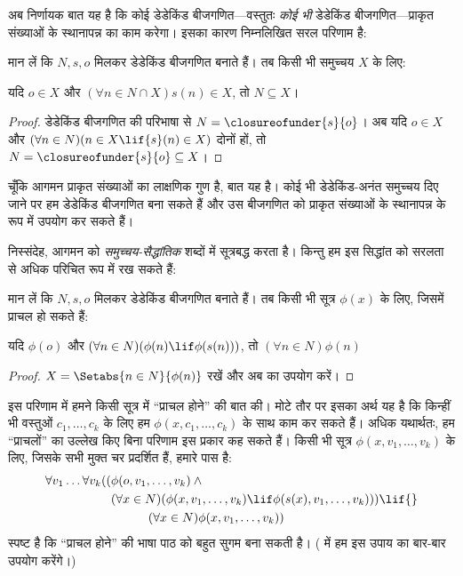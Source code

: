 \documentclass[../../../include/open-logic-section]{subfiles}
\begin{document}

अब निर्णायक बात यह है कि कोई डेडेकिंड बीजगणित---वस्तुतः \emph{कोई भी}
डेडेकिंड बीजगणित---प्राकृत संख्याओं के स्थानापन्न का काम करेगा। इसका कारण
निम्नलिखित सरल परिणाम है:

\begin{thm}
मान लें कि $N, s, o$ मिलकर डेडेकिंड बीजगणित बनाते हैं। तब किसी भी समुच्चय $X$ के लिए:
	\begin{center}
		यदि $o \in X$ और $(\forall {n} \in N \cap X){s}({n}) \in X$, तो $N \subseteq X$।
	\end{center}
\end{thm}

\begin{proof}
डेडेकिंड बीजगणित की परिभाषा से $N = \closureofunder{s}{o}$। अब यदि ${o} \in X$
और $(\forall {n} \in N)(n \in X \lif
{s}({n}) \in X)$ दोनों हों, तो $N = \closureofunder{s}{o} \subseteq X$।
\end{proof}

चूँकि आगमन प्राकृत संख्याओं का लाक्षणिक गुण है, बात यह है। कोई भी
डेडेकिंड-अनंत समुच्चय दिए जाने पर हम डेडेकिंड बीजगणित बना सकते हैं और उस
बीजगणित को प्राकृत संख्याओं के स्थानापन्न के रूप में उपयोग कर सकते हैं।

निस्संदेह,  आगमन को \emph{समुच्चय-सैद्धांतिक}
शब्दों में सूत्रबद्ध करता है। किन्तु हम इस सिद्धांत को सरलता से अधिक परिचित
रूप में रख सकते हैं:

\begin{cor}
मान लें कि $N, s, o$ मिलकर डेडेकिंड बीजगणित बनाते हैं। तब किसी भी सूत्र
$\phi(x)$ के लिए, जिसमें प्राचल हो सकते हैं:
\begin{center}
	यदि $\phi(o)$ और $(\forall {n} \in N)(\phi(n)\lif
	\phi({s}({n})))$, तो $(\forall n \in N)\phi(n)$
\end{center}
\end{cor}

\begin{proof}
$X = \Setabs{n \in N}{\phi(n)}$ रखें और अब
 का उपयोग करें।
\end{proof}

इस परिणाम में हमने किसी सूत्र में ``प्राचल होने'' की बात की। मोटे तौर पर इसका
अर्थ यह है कि किन्हीं भी वस्तुओं $c_1, \ldots, c_k$ के लिए हम
$\phi(x, c_1, \ldots, c_k)$ के साथ काम कर सकते हैं। अधिक यथार्थतः, हम
``प्राचलों'' का उल्लेख किए बिना परिणाम इस प्रकार कह सकते हैं। किसी भी सूत्र
$\phi(x, v_1, \ldots, v_k)$ के लिए, जिसके सभी मुक्त चर प्रदर्शित हैं, हमारे पास है:
	\begin{align*}
			\forall v_1 \ldots \forall v_k((&\phi(o, v_1,\ldots, v_k) \land {}\\
			&	(\forall x \in N)(\phi(x,v_1, \ldots, v_k) \lif \phi(s(x), v_1,\ldots, v_k))) \lif {}\\
			&\hspace{3em} (\forall x \in N)\phi(x, v_1,\ldots, v_k))
	\end{align*}
स्पष्ट है कि ``प्राचल होने'' की भाषा पाठ को बहुत सुगम बना सकती है।
( में हम इस उपाय का बार-बार उपयोग करेंगे।)
\end{document}
